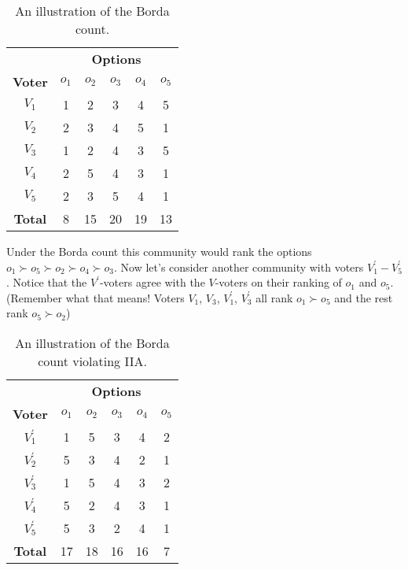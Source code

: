 \begin{table}
\centering
    \begin{tabular}{cccccc}
    \toprule
      & \multicolumn{5}{c}{\bf Options} \\ \cmidrule(lr){2-6}
       {\bf Voter} & $o_1$ & $o_2$ & $o_3$ & $o_4$ & $o_5$ \\
            \midrule
    $V_1$   & 1 & 2 & 3 & 4 & 5 \\
    $V_2$   & 2 & 3 & 4 & 5 & 1 \\
    $V_3$   & 1 & 2 & 4 & 3 & 5 \\
    $V_4$   & 2 & 5 & 4 & 3 & 1 \\
    $V_5$   & 2 & 3 & 5 & 4 & 1 \\
    \midrule
    {\bf Total} & 8 & 15 & 20 & 19 & 13 \\     
     \bottomrule
    \end{tabular}
    \medskip
    \label{t:borda-IIA}
    \caption{An illustration of the Borda count.}
\end{table}
Under the Borda count this community would rank the options $o_1 \succ o_5 \succ o_2 \succ o_4 \succ o_3$.  Now let's consider another community with voters $V^\prime_1 - V^\prime_5$.  Notice that the $V^\prime$-voters agree with the $V$-voters on their ranking of $o_1$ and $o_5$.  (Remember what that means! Voters $V_1$, $V_3$, $V_1^\prime$, $V_3^\prime$ all rank $o_1 \succ o_5$ and the rest rank $o_5 \succ o_2$)

\begin{table}
\centering
    \begin{tabular}{cccccc}
    \toprule
      & \multicolumn{5}{c}{\bf Options} \\ \cmidrule(lr){2-6}
       {\bf Voter} & $o_1$ & $o_2$ & $o_3$ & $o_4$ & $o_5$ \\
            \midrule
    $V_1^\prime$   & 1 & 5 & 3 & 4 & 2 \\
    $V_2^\prime$   & 5 & 3 & 4 & 2 & 1 \\
    $V_3^\prime$   & 1 & 5 & 4 & 3 & 2 \\
    $V_4^\prime$   & 5 & 2 & 4 & 3 & 1 \\
    $V_5^\prime$   & 5 & 3 & 2 & 4 & 1 \\
    \midrule
    {\bf Total} & 17 & 18 & 16 & 16 & 7 \\     
     \bottomrule
    \end{tabular}
    \medskip
    \label{t:borda-IIA-prime}
    \caption{An illustration of the Borda count violating IIA.}
\end{table}


